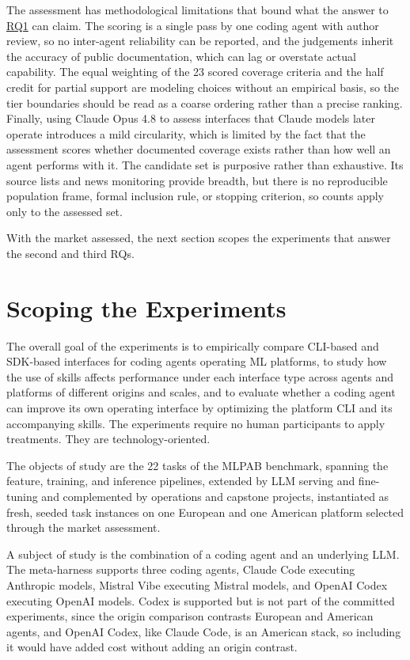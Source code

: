 \documentclass[
english,                 %
bibtex,                  %
]{kththesis}
\numberwithin{listing}{chapter}
\begin{document}
The assessment has methodological limitations that bound what the answer to \hyperref[rq1]{RQ1} can claim. The scoring is a single pass by one coding agent with author review, so no inter-agent reliability can be reported, and the judgements inherit the accuracy of public documentation, which can lag or overstate actual capability. The equal weighting of the 23 scored coverage criteria and the half credit for partial support are modeling choices without an empirical basis, so the tier boundaries should be read as a coarse ordering rather than a precise ranking. Finally, using Claude Opus 4.8 to assess interfaces that Claude models later operate introduces a mild circularity, which is limited by the fact that the assessment scores whether documented coverage exists rather than how well an agent performs with it. The candidate set is purposive rather than exhaustive. Its source lists and news monitoring provide breadth, but there is no reproducible population frame, formal inclusion rule, or stopping criterion, so counts apply only to the assessed set.

With the market assessed, the next section scopes the experiments that answer the second and third \glspl{RQ}.

\section{Scoping the Experiments}
\label{sec:method_scoping_the_experiments}
\glsresetall

The overall goal of the experiments is to empirically compare \gls{CLI}-based and \gls{SDK}-based interfaces for coding agents operating \gls{ML} platforms, to study how the use of skills affects performance under each interface type across agents and platforms of different origins and scales, and to evaluate whether a coding agent can improve its own operating interface by optimizing the platform \gls{CLI} and its accompanying skills. The experiments require no human participants to apply treatments. They are technology-oriented.

The objects of study are the 22 tasks of the \gls{MLPAB} benchmark, spanning the feature, training, and inference pipelines, extended by \gls{LLM} serving and fine-tuning and complemented by operations and capstone projects, instantiated as fresh, seeded task instances on one European and one American platform selected through the market assessment.

A subject of study is the combination of a coding agent and an underlying \gls{LLM}. The meta-harness supports three coding agents, Claude Code executing Anthropic models, Mistral Vibe executing Mistral models, and \gls{OpenAI} Codex executing \gls{OpenAI} models. Codex is supported but is not part of the committed experiments, since the origin comparison contrasts European and American agents, and \gls{OpenAI} Codex, like Claude Code, is an American stack, so including it would have added cost without adding an origin contrast.
\end{document}
